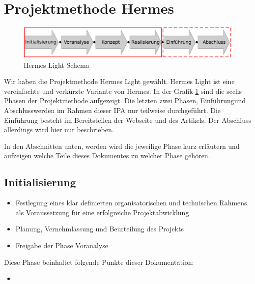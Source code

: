 \documentclass[11pt,paper=a4,final]{scrartcl}
\begin{document}
\section{Projektmethode Hermes}
\begin{figure}[htb!]
  \centering
  \includegraphics[width=\textwidth]{hermes.pdf}
  \caption{Hermes Light Schema}
  \label{fig:hermes_schema}
\end{figure}
Wir haben die Projektmethode Hermes Light gew\"ahlt. Hermes Light ist eine vereinfachte und verkürzte Variante von Hermes. In der Grafik \ref{fig:hermes_schema} sind die sechs Phasen der Projektmethode aufgezeigt. Die letzten zwei Phasen, \glqq Einführung\grqq und \glqq Abschluss\grqq werden im Rahmen dieser IPA nur teilweise durchgeführt. Die Einf\"uhrung besteht im Bereitstellen der Webseite und des Artikels. Der Abschluss allerdings wird hier nur beschrieben.

In den Abschnitten unten, werden wird die jeweilige Phase kurz erläutern und aufzeigen welche Teile dieses Dokumentes zu welcher Phase gehören.
\newpage
\subsection{Initialisierung}
\begin{itemize}
  \item Festlegung eines klar definierten organisatorischen und technischen Rahmens als Voraussetzung für eine erfolgreiche Projektabwicklung
  \item Planung, Vernehmlassung und Beurteilung des Projekts
  \item Freigabe der Phase Voranalyse
\end{itemize}
Diese Phase beinhaltet folgende Punkte dieser Dokumentation:
\begin{itemize}
  \item 
\end{itemize}
\end{document}
